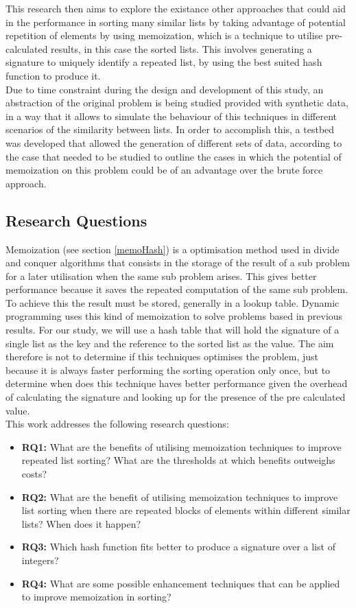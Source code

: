 \documentclass[a4paper,12pt]{article}
\begin{document}
This research then aims to explore the existance other approaches that could aid in the performance in sorting many similar lists by taking advantage of potential repetition of elements by using memoization, which is a technique to utilise pre-calculated results, in this case the sorted lists. This involves generating a signature to uniquely identify a repeated list, by using the best suited hash function to produce it.
\\

Due to time constraint during the design and development of this study, an abstraction of the original problem is being studied provided with synthetic data, in a way that it allows to simulate the behaviour of this techniques in different scenarios of the similarity between lists. In order to accomplish this, a testbed was developed that allowed the generation of different sets of data, according to the case that needed to be studied to outline the cases in which the potential of memoization on this problem could be of an advantage over the brute force approach.

\subsection*{Research Questions}  \label{researchQuestions}
Memoization (see section \ref{memoHash}) is a optimisation method used in divide and conquer algorithms that consists in the storage of the result of a sub problem for a later utilisation when the same sub problem arises. This gives better performance because it saves the repeated computation of the same sub problem. To achieve this the result must be stored, generally in a lookup table. Dynamic programming uses this kind of memoization to solve problems based in previous results. For our study, we will use a hash table that will hold the signature of a single list as the key and the reference to the sorted list as the value. The aim therefore is not to determine if this techniques optimises the problem, just because it is always faster performing the sorting operation only once, but to determine when does this technique haves better performance given the overhead of calculating the signature and looking up for the presence of the pre calculated value.\\

This work addresses the following research questions:

\begin{itemize}
\item {\bf RQ1:} What are the benefits of utilising memoization techniques to improve repeated list sorting? What are the thresholds at which benefits outweighs costs?
\item {\bf RQ2:} What are the benefit of utilising memoization techniques to improve list sorting when there are repeated blocks of elements within different similar lists? When does it happen?
\item {\bf RQ3:} Which hash function fits better to produce a signature over a list of integers?
\item {\bf RQ4:} What are some possible enhancement techniques that can be applied to improve memoization in sorting?
\end{itemize}
\end{document}
